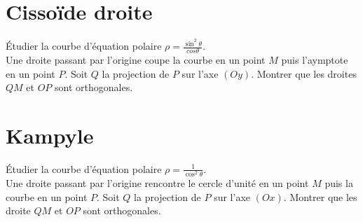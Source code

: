 \documentclass{article}
\begin{document}
\section{Cisso\"ide droite}
\'Etudier la courbe d'\'equation polaire $\rho=\frac{\sin^2\theta}{cos\theta}$.\\
Une droite passant par l'origine coupe la courbe en un point $M$ puis l'aymptote en un point $P$. Soit $Q$ la projection de $P$ sur l'axe $(Oy)$. Montrer que les droites $QM$ et $OP$ sont orthogonales.

\section{Kampyle}
\'Etudier la courbe d'\'equation polaire $\rho=\frac{1}{\cos^2\theta}$.\\
Une droite passant par l'origine rencontre le cercle d'unit\'e en un point $M$ puis la courbe en un point $P$. Soit $Q$ la projection de $P$ sur l'axe $(Ox)$. Montrer que les droite $QM$ et $OP$ sont orthogonales.
\end{document}
